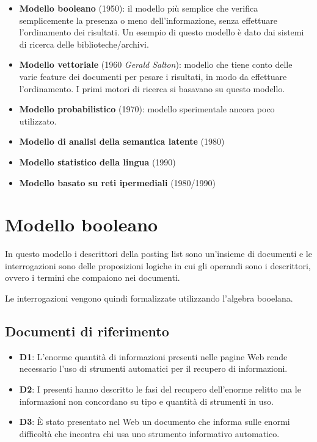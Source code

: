 \begin{itemize}
	\item \textbf{Modello booleano} (1950): il modello più semplice che verifica semplicemente la presenza o meno dell'informazione, senza effettuare l'ordinamento dei risultati. Un esempio di questo modello è dato dai sistemi di ricerca delle biblioteche/archivi.
	\item \textbf{Modello vettoriale} (1960 \textit{Gerald Salton}): modello che tiene conto delle varie feature dei documenti per pesare i risultati, in modo da effettuare l'ordinamento. I primi motori di ricerca si basavano su questo modello.
	\item \textbf{Modello probabilistico} (1970): modello sperimentale ancora poco utilizzato.
	\item \textbf{Modello di analisi della semantica latente} (1980)
	\item \textbf{Modello statistico della lingua} (1990)
	\item \textbf{Modello basato su reti ipermediali} (1980/1990)
\end{itemize}

\section{Modello booleano}


In questo modello i descrittori della posting list sono un'insieme di documenti e le interrogazioni sono delle proposizioni logiche in cui gli operandi sono i descrittori, ovvero i termini che compaiono nei documenti.

Le interrogazioni vengono quindi formalizzate utilizzando l'algebra booelana.

\subsection{Documenti di riferimento}

\begin{itemize}
	\item \textbf{D1}: L’enorme quantità di informazioni presenti nelle pagine Web rende necessario l’uso di strumenti automatici per il recupero di informazioni.
	\item \textbf{D2}: I presenti hanno descritto le fasi del recupero dell'enorme relitto ma le informazioni non concordano su tipo e quantità di strumenti in uso.
	\item \textbf{D3}: \`E stato presentato nel Web un documento che informa sulle enormi difficoltà che incontra chi usa uno strumento informativo automatico.
\end{itemize}


